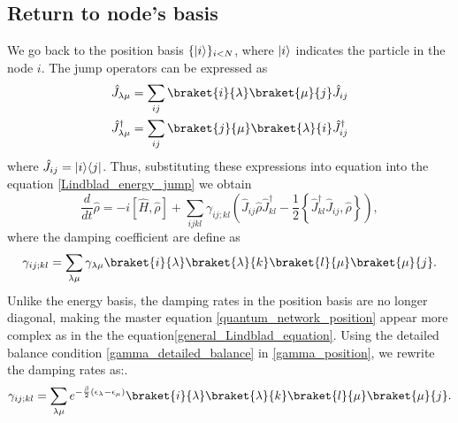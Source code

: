\subsection{Return to node's basis}
We go back to the position basis $\{\lvert i\rangle\}_{i<N}$, where $\lvert i\rangle$ indicates the particle in the node $i$.  
The jump operators can be expressed as
\begin{align}
    \hat J_{\lambda\mu} = \sum_{ij} \braket{i}{\lambda}\braket{\mu}{j}\hat J_{ij}\\
    \hat J_{\lambda\mu}^\dagger = \sum_{ij} \braket{j}{\mu}\braket{\lambda}{i}\hat J_{ij}^\dagger
\end{align}
where $\hat J_{ij} = \lvert i\rangle\langle j\rvert$.
Thus, substituting these expressions into equation into the equation \eqref{Lindblad_energy_jump} we obtain
\begin{equation}\label{quantum_network_position}
    \frac{d}{dt}\hat\rho = -i\left[\hat H,\hat\rho\right] +\sum_{ijkl} \gamma_{ij;kl} \left(\hat J_{ij}\hat\rho \hat J_{kl}^\dagger - \frac{1}{2}\left\{ \hat J_{kl}^\dagger\hat J_{ij}, \hat\rho\right\} \right),
\end{equation}
where the damping coefficient are define as
\begin{equation}\label{gamma_position}
    \gamma_{ij;kl}= \sum_{\lambda\mu}\gamma_{\lambda\mu}\braket{i}{\lambda}\braket{\lambda}{k}\braket{l}{\mu}\braket{\mu}{j}.
\end{equation}
Unlike the energy basis, the damping rates in the position basis are no longer diagonal, making the master equation \eqref{quantum_network_position} appear more complex as in the the equation\eqref{general_Lindblad_equation}. Using the detailed balance condition \eqref{gamma_detailed_balance} in \eqref{gamma_position}, we rewrite the damping rates as:.
\begin{equation}
    \gamma_{ij;kl}= \sum_{\lambda\mu}e^{-\frac{\beta}{2}\left(\epsilon_\lambda - \epsilon_\mu\right)}\braket{i}{\lambda}\braket{\lambda}{k}\braket{l}{\mu}\braket{\mu}{j}.
\end{equation}
